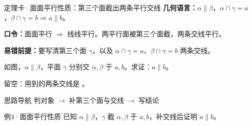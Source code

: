 \documentclass{exam-zh}
\begin{document}
\begin{eduSolutionBox}{定理卡·面面平行性质：第三个面截出两条平行交线}
  \begingroup
  \setlength{\parskip}{2.5mm}
\textbf{几何语言：}$\alpha\parallel\beta$，$\alpha\cap\gamma=a$，$\beta\cap\gamma=b\Rightarrow a\parallel b$。\par
\textbf{口令：}面面平行 $\Rightarrow$ 线线平行。两平行面被第三个面截，两条交线平行。\par
\textbf{易错前提：}要写清第三个面 $\gamma$，以及 $\alpha\cap\gamma=a$、$\beta\cap\gamma=b$ 两条交线。\par
  \endgroup
\end{eduSolutionBox}




\begin{eduProblemBlock}[例4·面面平行性质]
如图，$\alpha\parallel\beta$，平面 $\gamma$ 分别交 $\alpha,\beta$ 于 $a,b$。求证：$a\parallel b$。
\par\noindent 留空：用到的两条交线是 \underline{\hspace{20mm}}。

\end{eduProblemBlock}





\begin{eduAuxItem}{思路导航}
判对象$\;\to\;$补第三个面与交线$\;\to\;$写结论\end{eduAuxItem}




\begin{eduSubQuestionItem}{例4·面面平行性质}
已知 $\alpha\parallel\beta$，$\gamma$ 截 $\alpha,\beta$ 于 $a,b$，补交线后证明 $a\parallel b$。\end{eduSubQuestionItem}

\begin{eduDualExplain}
  \begin{eduExplainLeft}
  \end{eduExplainLeft}

  \begin{eduExplainRight}
  \end{eduExplainRight}
\end{eduDualExplain}
\end{document}
